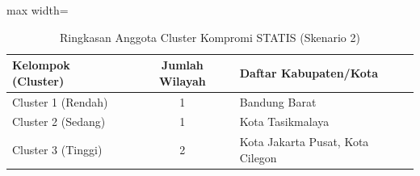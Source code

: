 \begin{table}[H]
\centering
\caption{Ringkasan Anggota Cluster Kompromi STATIS (Skenario 2)} \label{tab:sample2compromclust}
\begin{adjustbox}{max width=\textwidth}
\begin{tabular}{|p{3cm}|c|p{10cm}|}
\hline
\textbf{Kelompok (Cluster)} & \textbf{Jumlah Wilayah} & \textbf{Daftar Kabupaten/Kota} \\
\hline
Cluster 1 (Rendah) & 1 & Bandung Barat \\
\hline
Cluster 2 (Sedang) & 1 & Kota Tasikmalaya \\
\hline
Cluster 3 (Tinggi) & 2 & Kota Jakarta Pusat, Kota Cilegon \\
\hline
\end{tabular}
\end{adjustbox}
\end{table}
